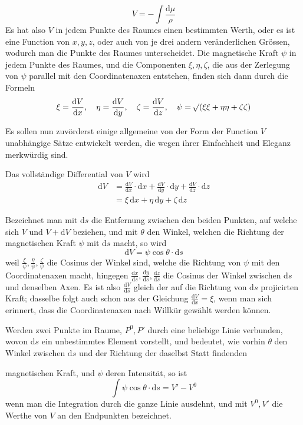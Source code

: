 \par\clearpage
{}
\[
V=-\int\frac{\mathrm{d}\mu}{\rho}
\]
Es hat also $V$ in jedem Punkte des Raumes einen bestimmten Werth, oder es ist eine Function von $x,y,z$, oder auch von je drei andern veränderlichen Grössen, wodurch man die Punkte des Raumes unterscheidet. Die magnetische Kraft $\psi$ in jedem Punkte des Raumes, und die Componenten $\xi,\eta,\zeta$, die aus der Zerlegung von $\psi$ parallel mit den Coordinatenaxen entstehen, finden sich dann durch die Formeln
\[
\xi=\frac{\mathrm{d}V}{\mathrm{d}x},\quad \eta=\frac{\mathrm{d}V}{\mathrm{d}y},\quad \zeta=\frac{\mathrm{d}V}{\mathrm{d}z},\quad \psi=\mathord{{}^{}\!\surd}(\xi\xi+\eta\eta+\zeta\zeta)
\]

Es sollen nun zuvörderst einige allgemeine von der Form der Function $V$ unabhängige Sätze entwickelt werden, die wegen ihrer Einfachheit und Eleganz merkwürdig sind.

Das vollständige Differential von $V$ wird
\[
\begin{aligned}
\mathrm{d}V&=\frac{\mathrm{d}V}{\mathrm{d}x}\cdot\mathrm{d}x+\frac{\mathrm{d}V}{\mathrm{d}y}\cdot\mathrm{d}y+\frac{\mathrm{d}V}{\mathrm{d}z}\cdot\mathrm{d}z\\
&=\xi\,\mathrm{d}x+\eta\,\mathrm{d}y+\zeta\,\mathrm{d}z
\end{aligned}
\]

Bezeichnet man mit $\mathrm{d}s$ die Entfernung zwischen den beiden Punkten, auf welche sich $V$ und $V+\mathrm{d}V$ beziehen, und mit $\theta$ den Winkel, welchen die Richtung der magnetischen Kraft $\psi$ mit $\mathrm{d}s$ macht, so wird
\[
\mathrm{d}V=\psi\cos\theta\cdot\mathrm{d}s
\]
weil $\frac{\xi}{\psi},\frac{\eta}{\psi},\frac{\zeta}{\psi}$ die Cosinus der Winkel sind, welche die Richtung von $\psi$ mit den Coordinatenaxen macht, hingegen $\frac{\mathrm{d}x}{\mathrm{d}s},\frac{\mathrm{d}y}{\mathrm{d}s},\frac{\mathrm{d}z}{\mathrm{d}s}$ die Cosinus der Winkel zwischen $\mathrm{d}s$ und denselben Axen. Es ist also $\frac{\mathrm{d}V}{\mathrm{d}s}$ gleich der auf die Richtung von $\mathrm{d}s$ projicirten Kraft; dasselbe folgt auch schon aus der Gleichung $\frac{\mathrm{d}V}{\mathrm{d}x}=\xi$, wenn man sich erinnert, dass die Coordinatenaxen nach Willkür gewählt werden können.

Werden zwei Punkte im Raume, $P^0,P'$ durch eine beliebige Linie verbunden, wovon $\mathrm{d}s$ ein unbestimmtes Element vorstellt, und bedeutet, wie vorhin $\theta$ den Winkel zwischen $\mathrm{d}s$ und der Richtung der daselbst Statt findenden
\par\clearpage
{}
\noindent magnetischen Kraft, und $\psi$ deren Intensität, so ist
\[
\int\psi\cos\theta\cdot\mathrm{d}s=V'-V^0
\]
wenn man die Integration durch die ganze Linie ausdehnt, und mit $V^0,V'$ die Werthe von $V$ an den Endpunkten bezeichnet.

